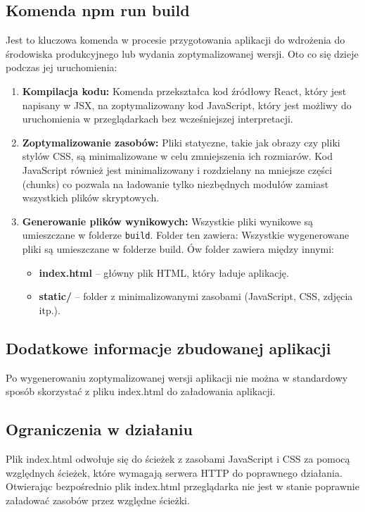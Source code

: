 \subsection{Komenda npm run build}
Jest to kluczowa komenda w procesie przygotowania aplikacji do wdrożenia do środowiska produkcyjnego lub wydania zoptymalizowanej wersji. Oto co się dzieje podczas jej uruchomienia:
\begin{enumerate}
    \item \textbf{Kompilacja kodu:}
    Komenda przekształca kod źródłowy React, który jest napisany w JSX, na zoptymalizowany kod JavaScript, który jest możliwy do uruchomienia w przeglądarkach bez wcześniejszej interpretacji.
    
    \item \textbf{Zoptymalizowanie zasobów:}  
    Pliki statyczne, takie jak obrazy czy pliki stylów CSS, są minimalizowane w celu zmniejszenia ich rozmiarów. Kod JavaScript również jest minimalizowany i rozdzielany na mniejsze części (chunks) co pozwala na ładowanie tylko niezbędnych modułów zamiast wszystkich plików skryptowych.

    \item \textbf{Generowanie plików wynikowych:}  
    Wszystkie pliki wynikowe są umieszczane w folderze \texttt{build}. Folder ten zawiera:
    Wszystkie wygenerowane pliki są umieszczane w folderze build. Ów folder zawiera między innymi:
    \begin{itemize}
        \item \textbf{index.html} – główny plik HTML, który ładuje aplikację.
        \item \textbf{static/} – folder z minimalizowanymi zasobami (JavaScript, CSS, zdjęcia itp.).
    \end{itemize}
\end{enumerate}
\subsection{Dodatkowe informacje zbudowanej aplikacji}
Po wygenerowaniu zoptymalizowanej wersji aplikacji nie można w standardowy sposób skorzystać z pliku index.html do załadowania aplikacji.

\subsection*{Ograniczenia w działaniu}
Plik index.html odwołuje się do ścieżek z zasobami JavaScript i CSS za pomocą względnych ścieżek, które wymagają serwera HTTP do poprawnego działania. Otwierając bezpośrednio plik index.html przeglądarka nie jest w stanie poprawnie załadować zasobów przez względne ścieżki.

